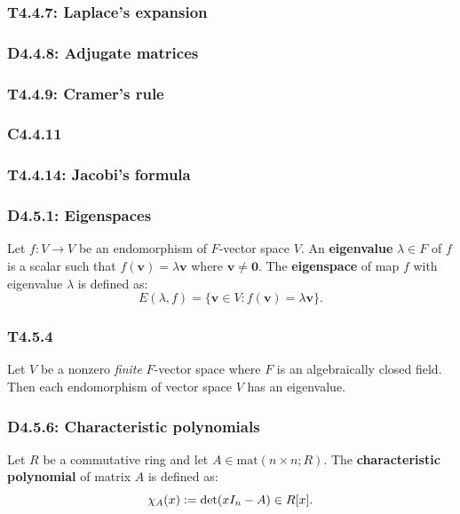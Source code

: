 \documentclass{article}
\newcommand{\deq}{\vcentcolon=}
\newcommand{\vc}[1]{\boldsymbol{#1}}
\begin{document}
\begin{multicols*}{3}
\subsubsection*{T4.4.7: Laplace's expansion}

\subsubsection*{D4.4.8: Adjugate matrices}

\subsubsection*{T4.4.9: Cramer's rule}

\subsubsection*{C4.4.11}

\subsubsection*{T4.4.14: Jacobi's formula}

\newcolumn

\subsubsection*{D4.5.1: Eigenspaces}
Let $f:V\rightarrow V$ be an endomorphism of $F$-vector space $V$.
An \textbf{eigenvalue} $\lambda\in F$ of $f$ is a scalar such that
$f(\vc{v})=\lambda\vc{v}$ where $\vc{v}\neq\vc{0}$. The \textbf{eigenspace}
of map $f$ with eigenvalue $\lambda$ is defined as:
$$E(\lambda,f)=\{\vc{v}\in V:f(\vc{v})=\lambda\vc{v}\}.$$

\subsubsection*{T4.5.4}
Let $V$ be a nonzero \textit{finite} $F$-vector space 
where $F$ is an algebraically closed field. Then each
endomorphism of vector space $V$ has an eigenvalue.

\subsubsection*{D4.5.6: Characteristic polynomials}
Let $R$ be a commutative ring and let $A\in\text{mat}(n\times n;R)$.
The \textbf{characteristic polynomial} of matrix $A$ is defined as:
$$\chi_A(x)\deq\det(xI_n-A)\in R[x].$$


\end{multicols*}
\end{document}
